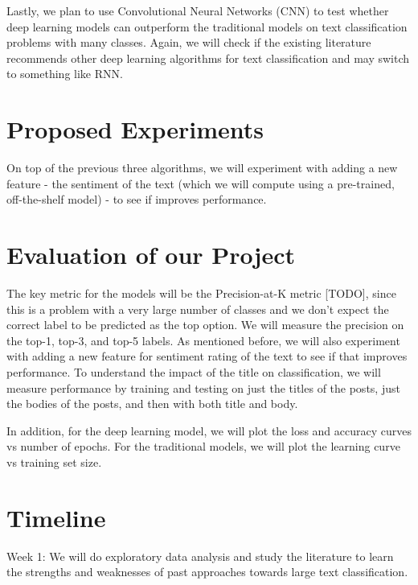 \documentclass{sig-alternate-05-2015}
\begin{document}
Lastly, we plan to use Convolutional Neural Networks (CNN) to test whether deep learning models can outperform the traditional models on text classification problems with many classes. Again, we will check if the existing literature recommends other deep learning algorithms for text classification and may switch to something like RNN.

\section{Proposed Experiments}

On top of the previous three algorithms, we will experiment with adding a new feature - the sentiment of the text (which we will compute using a pre-trained, off-the-shelf model) - to see if improves performance.

\section{Evaluation of our Project}

The key metric for the models will be the Precision-at-K metric [TODO], since this is a problem with a very large number of classes and we don't expect the correct label to be predicted as the top option. We will measure the precision on the top-1, top-3, and top-5 labels. As mentioned before, we will also experiment with adding a new feature for sentiment rating of the text to see if that improves performance. To understand the impact of the title on classification, we will measure performance by training and testing on just the titles of the posts, just the bodies of the posts, and then with both title and body.


In addition, for the deep learning model, we will plot the loss and accuracy curves vs number of epochs. For the traditional models, we will plot the learning curve vs training set size.

\section{Timeline}

Week 1: We will do exploratory data analysis and study the literature to learn the strengths and weaknesses of past approaches towards large text classification.
\end{document}
